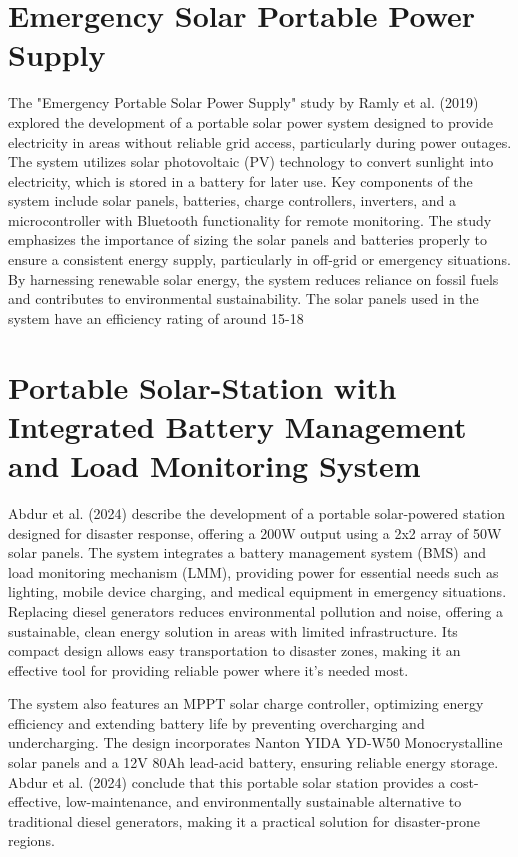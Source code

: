 {\section{Emergency Solar Portable Power Supply}

The "Emergency Portable Solar Power Supply" study by Ramly et al. (2019) explored the development of a portable solar power system designed to provide electricity in areas without reliable grid access, particularly during power outages. The system utilizes solar photovoltaic (PV) technology to convert sunlight into electricity, which is stored in a battery for later use. Key components of the system include solar panels, batteries, charge controllers, inverters, and a microcontroller with Bluetooth functionality for remote monitoring. The study emphasizes the importance of sizing the solar panels and batteries properly to ensure a consistent energy supply, particularly in off-grid or emergency situations. By harnessing renewable solar energy, the system reduces reliance on fossil fuels and contributes to environmental sustainability. The solar panels used in the system have an efficiency rating of around 15-18%

\section{Portable Solar-Station with Integrated Battery Management and Load Monitoring System}

Abdur et al. (2024) describe the development of a portable solar-powered station designed for disaster response, offering a 200W output using a 2x2 array of 50W solar panels. The system integrates a battery management system (BMS) and load monitoring mechanism (LMM), providing power for essential needs such as lighting, mobile device charging, and medical equipment in emergency situations. Replacing diesel generators reduces environmental pollution and noise, offering a sustainable, clean energy solution in areas with limited infrastructure. Its compact design allows easy transportation to disaster zones, making it an effective tool for providing reliable power where it’s needed most.

The system also features an MPPT solar charge controller, optimizing energy efficiency and extending battery life by preventing overcharging and undercharging. The design incorporates Nanton YIDA YD-W50 Monocrystalline solar panels and a 12V 80Ah lead-acid battery, ensuring reliable energy storage. Abdur et al. (2024) conclude that this portable solar station provides a cost-effective, low-maintenance, and environmentally sustainable alternative to traditional diesel generators, making it a practical solution for disaster-prone regions.

}
